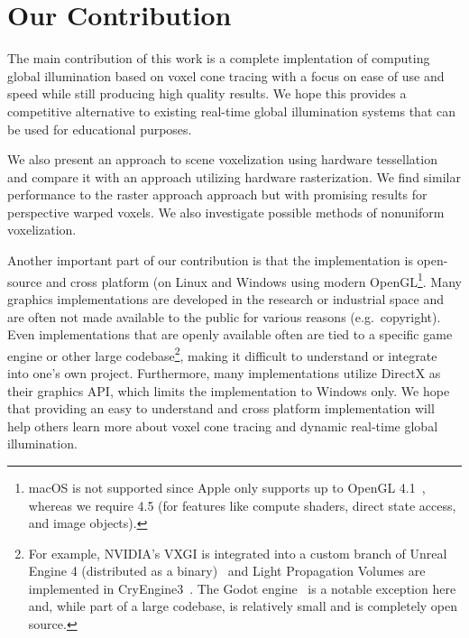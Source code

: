 \section{Our Contribution}
The main contribution of this work is a complete implentation of computing global illumination based on voxel cone tracing with a focus on ease of use and speed while still producing high quality results. We hope this provides a competitive alternative to existing real-time global illumination systems that can be used for educational purposes.

 We also present an approach to scene voxelization using hardware tessellation and compare it with an approach utilizing hardware rasterization. We find similar performance to the raster approach approach but with promising results for perspective warped voxels. We also investigate possible methods of nonuniform voxelization.


Another important part of our contribution is that the implementation is open-source and cross platform (on Linux and Windows using modern OpenGL\footnote{macOS is not supported since Apple only supports up to OpenGL 4.1~\cite{appleopenglsupport}, whereas we require 4.5 (for features like compute shaders, direct state access, and image objects).}. Many graphics implementations are developed in the research or industrial space and are often not made available to the public for various reasons (e.g.\ copyright). Even implementations that are openly available often are tied to a specific game engine or other large codebase\footnote{For example, NVIDIA's VXGI is integrated into a custom branch of Unreal Engine 4 (distributed as a binary)~\cite{nvidiavxgi} and Light Propagation Volumes are implemented in CryEngine3~\cite{kaplanyan2009light}. The Godot engine~\cite{godotengine} is a notable exception here and, while part of a large codebase, is relatively small and is completely open source.}, making it difficult to understand or integrate into one's own project. Furthermore, many implementations utilize DirectX as their graphics API, which limits the implementation to Windows only. We hope that providing an easy to understand and cross platform implementation will help others learn more about voxel cone tracing and dynamic real-time global illumination.
